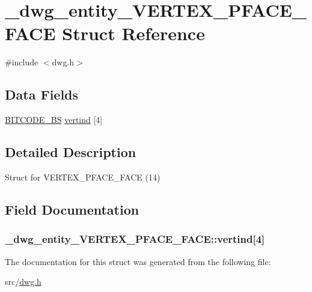 \hypertarget{struct__dwg__entity__VERTEX__PFACE__FACE}{\section{\-\_\-dwg\-\_\-entity\-\_\-\-V\-E\-R\-T\-E\-X\-\_\-\-P\-F\-A\-C\-E\-\_\-\-F\-A\-C\-E \-Struct \-Reference}
\label{struct__dwg__entity__VERTEX__PFACE__FACE}
}


{\ttfamily \#include $<$dwg.\-h$>$}

\subsection*{\-Data \-Fields}
\begin{DoxyCompactItemize}
\item 
\hyperlink{dwg_8h_a94297606fbd4a4ff97e8add284af0809}{\-B\-I\-T\-C\-O\-D\-E\-\_\-\-B\-S} \hyperlink{struct__dwg__entity__VERTEX__PFACE__FACE_ae727448c7e592e92f3e80a0f363f78f4}{vertind} \mbox{[}4\mbox{]}
\end{DoxyCompactItemize}


\subsection{\-Detailed \-Description}
\-Struct for \-V\-E\-R\-T\-E\-X\-\_\-\-P\-F\-A\-C\-E\-\_\-\-F\-A\-C\-E (14) 

\subsection{\-Field \-Documentation}
\hypertarget{struct__dwg__entity__VERTEX__PFACE__FACE_ae727448c7e592e92f3e80a0f363f78f4}{
\subsubsection[{vertind}]{ {\bf \-\_\-dwg\-\_\-entity\-\_\-\-V\-E\-R\-T\-E\-X\-\_\-\-P\-F\-A\-C\-E\-\_\-\-F\-A\-C\-E\-::vertind}\mbox{[}4\mbox{]}}}\label{struct__dwg__entity__VERTEX__PFACE__FACE_ae727448c7e592e92f3e80a0f363f78f4}


\-The documentation for this struct was generated from the following file\-:\begin{DoxyCompactItemize}
\item 
src/\hyperlink{dwg_8h}{dwg.\-h}\end{DoxyCompactItemize}
